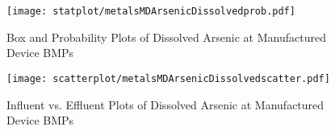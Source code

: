         \begin{figure}[hb]   %
            \centering
            \texttt{[image: statplot/metalsMDArsenicDissolvedprob.pdf]}
            \caption{Box and Probability Plots of Dissolved Arsenic at Manufactured Device BMPs}
        \end{figure}         %
        
        
        \begin{figure}[hb]   %
            \centering
            \texttt{[image: scatterplot/metalsMDArsenicDissolvedscatter.pdf]}
            \caption{Influent vs. Effluent Plots of Dissolved Arsenic at Manufactured Device BMPs}
        \end{figure}         %
        \clearpage
        